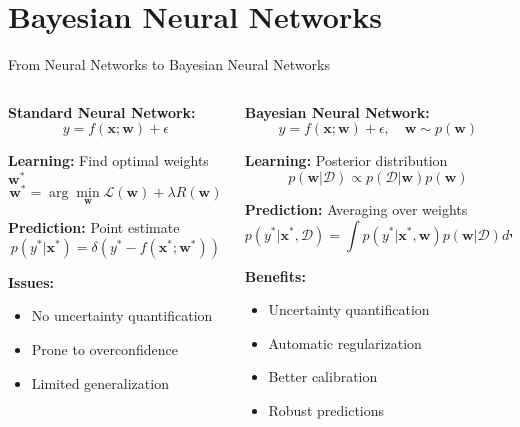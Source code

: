 \documentclass[aspectratio=169,11pt]{beamer}
\newcommand{\bw}{\mathbf{w}}
\newcommand{\bx}{\mathbf{x}}
\begin{document}
\section{Bayesian Neural Networks}

\begin{frame}{From Neural Networks to Bayesian Neural Networks}
\begin{columns}
\begin{column}{0.5\textwidth}
\textbf{Standard Neural Network:}
\[y = f(\bx; \bw) + \epsilon\]

\textbf{Learning:} Find optimal weights $\bw^*$
\[\bw^* = \arg\min_{\bw} \mathcal{L}(\bw) + \lambda R(\bw)\]

\textbf{Prediction:} Point estimate
\[p(y^*|\bx^*) = \delta(y^* - f(\bx^*; \bw^*))\]

\vspace{0.3cm}
\textbf{Issues:}
\begin{itemize}
\item No uncertainty quantification
\item Prone to overconfidence
\item Limited generalization
\end{itemize}
\end{column}
\begin{column}{0.5\textwidth}
\textbf{Bayesian Neural Network:}
\[y = f(\bx; \bw) + \epsilon, \quad \bw \sim p(\bw)\]

\textbf{Learning:} Posterior distribution
\[p(\bw|\mathcal{D}) \propto p(\mathcal{D}|\bw) p(\bw)\]

\textbf{Prediction:} Averaging over weights
\[p(y^*|\bx^*, \mathcal{D}) = \int p(y^*|\bx^*, \bw) p(\bw|\mathcal{D}) d\bw\]

\vspace{0.3cm}
\textbf{Benefits:}
\begin{itemize}
\item \textcolor{forest}{Uncertainty quantification}
\item \textcolor{forest}{Automatic regularization}
\item \textcolor{forest}{Better calibration}
\item \textcolor{forest}{Robust predictions}
\end{itemize}
\end{column}
\end{columns}
\end{frame}
\end{document}
